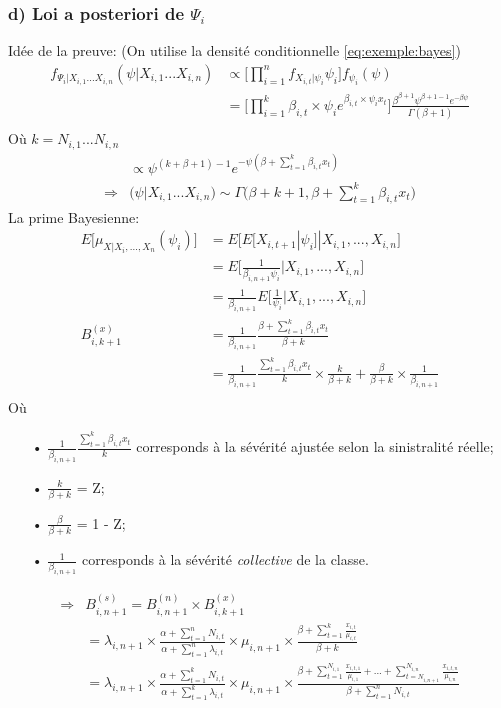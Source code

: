 \subsubsection*{d) Loi a posteriori de $\Psi_i$}
Idée de la preuve: (On utilise la densité conditionnelle \ref{eq:exemple:bayes})
\begin{align*}
f_{\Psi_i|X_{i,1}...X_{i,n}}(\psi|X_{i,1}...X_{i,n}) &\propto \Bigg[\prod_{i=1}^{n} f_{X_{i,t}|\psi_i}\psi_i\Bigg] f_{\psi_i}(\psi) \\
&= \Bigg[\prod_{i=1}^{k} \beta _{i,t} \times \psi_i e^{\beta _{i,t} \times \psi_i x_t} \Bigg] \frac{\beta^{\beta+1} \psi^{\beta + 1 -1} e^{-\beta \psi}}{\Gamma(\beta + 1)} \\
\end{align*}
Où $k = N_{i,1}...N_{i,n}$
\begin{align*}
& \propto \psi^{(k+\beta + 1)-1} e^{-\psi(\beta + \sum_{t=1}^{k}\beta_{i,t} x_t)} \\
\Rightarrow& \Big( \psi|X_{i,1}...X_{i,n}\Big) \sim \Gamma\Big(\beta + k + 1, \beta + \sum_{t=1}^{k}\beta_{i,t} x_t \Big) 
\end{align*}
La prime Bayesienne:
\begin{align*}
E\Big[\mu_{X|X_i,...,X_n}(\psi_i) \Big] &= E\Big[E\big[X_{i,t+1}|\psi_i\big]|X_{i,1},...,X_{i,n} \Big]\\
&= E\Bigg[\frac{1}{\beta_{i,n+1}\psi_i}|X_{i,1},...,X_{i,n} \Bigg]\\
&= \frac{1}{\beta_{i,n+1}}E\Bigg[\frac{1}{\psi_i}|X_{i,1},...,X_{i,n} \Bigg]\\
B_{i,k+1}^{(x)} &= \frac{1}{\beta_{i,n+1}}\frac{\beta + \sum_{t=1}^{k}\beta_{i,t} x_t}{\beta + k}\\
&= \frac{1}{\beta_{i,n+1}}\frac{\sum_{t=1}^{k}\beta_{i,t} x_t}{k} \times \frac{k}{\beta + k} + \frac{\beta}{\beta + k} \times \frac{1}{\beta_{i,n+1}}\\
\end{align*}
Où 
\begin{itemize}
\item[•] $\frac{1}{\beta_{i,n+1}}\frac{\sum_{t=1}^{k}\beta_{i,t} x_t}{k}$ corresponds à la sévérité ajustée selon la sinistralité réelle;
\item[•] $\frac{k}{\beta + k}$ = Z;
\item[•] $\frac{\beta}{\beta + k}$ = 1 - Z;
\item[•] $\frac{1}{\beta_{i,n+1}} $ corresponds à la sévérité \textit{collective} de la classe.
\end{itemize}

\begin{align*}
\Rightarrow & B_{i,n+1}^{(s)} = B_{i,n+1}^{(n)} \times B_{i,k+1}^{(x)} \\
&= \lambda_{i,n+1} \times \frac{\alpha + \sum_{t=1}^{n} N_{i,t}}{\alpha+ \sum_{t=1}^{n} \lambda_{i,t}} \times \mu_{i,n+1} \times \frac{\beta + \sum_{t=1}^{k}\frac{x_{i,t}} {\mu_{i,t}} }{\beta + k} \\
&= \lambda_{i,n+1} \times \frac{\alpha + \sum_{t=1}^{k} N_{i,t}}{\alpha+ \sum_{t=1}^{k} \lambda_{i,t}} \times \mu_{i,n+1} \times \frac{\beta + \sum_{t=1}^{N_{i,1}}\frac{ x_{i,t,1}}{\mu_{i,1}} +...+ \sum_{t=N_{i,n+1}}^{N_{i,n}}\frac{ x_{i,t,n}}{\mu_{i,n}} }{\beta + \sum_{t=1}^{n}N_{i,t}} 
\end{align*}
